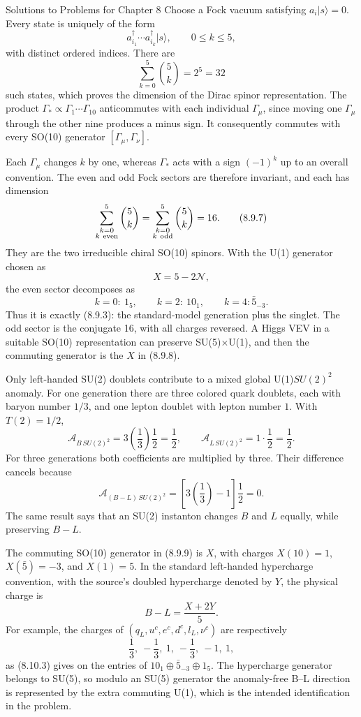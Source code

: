 \begin{bankssolutions}{Solutions to Problems for Chapter 8}
Choose a Fock vacuum satisfying $a_i|s\rangle=0$.  Every state is uniquely
of the form
\[
  a_{i_1}^\dagger\cdots a_{i_k}^\dagger|s\rangle,
  \qquad 0\leq k\leq5,
\]
with distinct ordered indices.  There are
\[
  \sum_{k=0}^{5}\binom{5}{k}=2^5=32
  \tag{8.9.6}
\]
such states, which proves the dimension of the Dirac spinor representation.
The product $\Gamma_*\propto\Gamma_1\cdots\Gamma_{10}$ anticommutes with
each individual $\Gamma_\mu$, since moving one $\Gamma_\mu$ through the
other nine produces a minus sign.  It consequently commutes with every
SO(10) generator $[\Gamma_\mu,\Gamma_\nu]$.

Each $\Gamma_\mu$ changes $k$ by one, whereas $\Gamma_*$ acts with a sign
$(-1)^k$ up to an overall convention.  The even and odd Fock sectors are
therefore invariant, and each has dimension
\[
  \sum_{\substack{k=0\\ k\ {\rm even}}}^{5}\binom{5}{k}
  =\sum_{\substack{k=0\\ k\ {\rm odd}}}^{5}\binom{5}{k}=16 .
  \tag{8.9.7}
\]
They are the two irreducible chiral SO(10) spinors.  With the U(1) generator
chosen as
\[
  X=5-2\mathcal N,
  \tag{8.9.8}
\]
the even sector decomposes as
\[
  k=0:\ 1_{5},\qquad k=2:\ 10_{1},\qquad k=4:\bar5_{-3}.
  \tag{8.9.9}
\]
Thus it is exactly (8.9.3): the standard-model generation plus the singlet.
The odd sector is the conjugate 16, with all charges reversed.  A Higgs VEV
in a suitable SO(10) representation can preserve SU(5)$\times$U(1), and then
the commuting generator is the $X$ in (8.9.8).

Only left-handed SU(2) doublets contribute to a mixed global
U(1)$SU(2)^2$ anomaly.  For one generation there are three colored quark
doublets, each with baryon number $1/3$, and one lepton doublet with lepton
number $1$.  With $T(2)=1/2$,
\[
  \mathcal A_{B\,SU(2)^2}
   =3\left(\frac13\right)\frac12=\frac12,
  \qquad
  \mathcal A_{L\,SU(2)^2}=1\cdot\frac12=\frac12 .
  \tag{8.10.1}
\]
For three generations both coefficients are multiplied by three.  Their
difference cancels because
\[
  \mathcal A_{(B-L)\,SU(2)^2}
  =\left[3\left(\frac13\right)-1\right]\frac12=0 .
  \tag{8.10.2}
\]
The same result says that an SU(2) instanton changes $B$ and $L$ equally,
while preserving $B-L$.

The commuting SO(10) generator in (8.9.9) is $X$, with charges
$X(10)=1$, $X(\bar5)=-3$, and $X(1)=5$.  In the standard left-handed
hypercharge convention, with the source's doubled hypercharge denoted by
$Y$, the physical charge is
\[
  B-L=\frac{X+2Y}{5} .
  \tag{8.10.3}
\]
For example, the charges of
$(q_L,u^c,e^c,d^c,l_L,\nu^c)$ are respectively
\[
  \frac13,\ -\frac13,\ 1,\ -\frac13,\ -1,\ 1,
\]
as (8.10.3) gives on the entries of $10_1\oplus\bar5_{-3}\oplus1_5$.
The hypercharge generator belongs to SU(5), so modulo an SU(5) generator the
anomaly-free B--L direction is represented by the extra commuting U(1), which
is the intended identification in the problem.


\end{bankssolutions}
